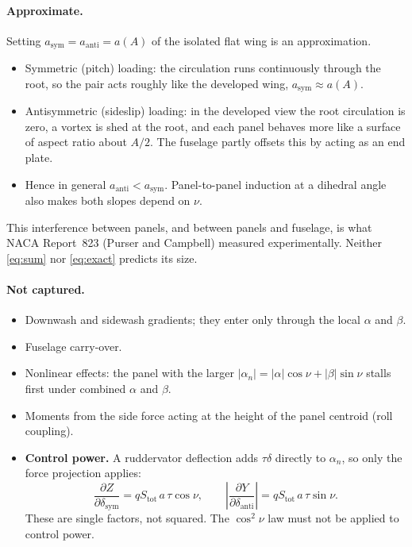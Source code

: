 \documentclass[11pt,a4paper]{article}
\begin{document}
\paragraph{Approximate.} Setting $a_\mathrm{sym}=a_\mathrm{anti}=a(A)$ of the isolated flat wing is
an approximation.
\begin{itemize}
  \item Symmetric (pitch) loading: the circulation runs continuously through the root, so the pair
        acts roughly like the developed wing, $a_\mathrm{sym}\approx a(A)$.
  \item Antisymmetric (sideslip) loading: in the developed view the root circulation is zero, a
        vortex is shed at the root, and each panel behaves more like a surface of aspect ratio about
        $A/2$. The fuselage partly offsets this by acting as an end plate.
  \item Hence in general $a_\mathrm{anti}<a_\mathrm{sym}$. Panel-to-panel induction at a dihedral
        angle also makes both slopes depend on $\nu$.
\end{itemize}
This interference between panels, and between panels and fuselage, is what NACA Report~823 (Purser
and Campbell) measured experimentally. Neither \eqref{eq:sum} nor \eqref{eq:exact} predicts its size.

\paragraph{Not captured.}
\begin{itemize}
  \item Downwash and sidewash gradients; they enter only through the local $\alpha$ and $\beta$.
  \item Fuselage carry-over.
  \item Nonlinear effects: the panel with the larger
        $|\alpha_n| = |\alpha|\cos\nu+|\beta|\sin\nu$ stalls first under combined $\alpha$ and $\beta$.
  \item Moments from the side force acting at the height of the panel centroid (roll coupling).
  \item \textbf{Control power.} A ruddervator deflection adds $\tau\delta$ directly to $\alpha_n$,
        so only the force projection applies:
        \begin{equation}
          \frac{\partial Z}{\partial\delta_\mathrm{sym}} = qS_\mathrm{tot}\,a\,\tau\cos\nu,\qquad
          \left|\frac{\partial Y}{\partial\delta_\mathrm{anti}}\right| = qS_\mathrm{tot}\,a\,\tau\sin\nu .
          \label{eq:control}
        \end{equation}
        These are single factors, not squared. The $\cos^2\nu$ law must not be applied to control power.
\end{itemize}
\end{document}
